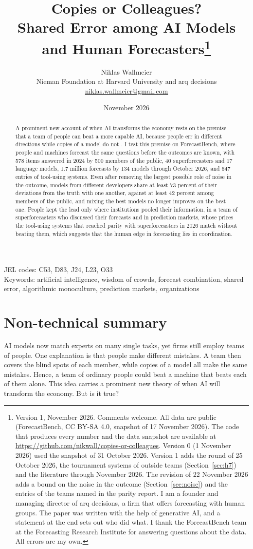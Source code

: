 \documentclass[11pt,a4paper]{article}
\title{\textbf{Copies or Colleagues?\\Shared Error among AI Models and Human Forecasters}\thanks{Version 1, November 2026. Comments welcome. All data are public (ForecastBench, CC BY-SA 4.0, snapshot of 17 November 2026). The code that produces every number and the data snapshot are available at \url{https://github.com/nikwall/copies-or-colleagues}. Version 0 (1 November 2026) used the snapshot of 31 October 2026. Version 1 adds the round of 25 October 2026, the tournament systems of outside teams (Section~\ref{sec:h7}) and the literature through November 2026. The revision of 22 November 2026 adds a bound on the noise in the outcome (Section~\ref{sec:noise}) and the entries of the teams named in the parity report. I am a founder and managing director of arq decisions, a firm that offers forecasting with human groups. The paper was written with the help of generative AI, and a statement at the end sets out who did what. I thank the ForecastBench team at the Forecasting Research Institute for answering questions about the data. All errors are my own.}}
\author{Niklas Wallmeier\\[2pt]
\small Nieman Foundation at Harvard University and arq decisions\\
\small \href{mailto:niklas.wallmeier@gmail.com}{niklas.wallmeier@gmail.com}}
\date{November 2026}
\theoremstyle{definition}
\begin{document}
\maketitle

\begin{abstract}
\noindent A prominent new account of when AI transforms the economy rests on the premise that a team of people can beat a more capable AI, because people err in different directions while copies of a model do not \citep{imas2026organizing}. I test this premise on ForecastBench, where people and machines forecast the same questions before the outcomes are known, with 578 items answered in 2024 by 500 members of the public, 40 superforecasters and 17 language models, 1.7 million forecasts by 134 models through October 2026, and 647 entries of tool-using systems. Even after removing the largest possible role of noise in the outcome, models from different developers share at least 73 percent of their deviations from the truth with one another, against at least 42 percent among members of the public, and mixing the best models no longer improves on the best one. People kept the lead only where institutions pooled their information, in a team of superforecasters who discussed their forecasts and in prediction markets, whose prices the tool-using systems that reached parity with superforecasters in 2026 match without beating them, which suggests that the human edge in forecasting lies in coordination.
\end{abstract}

\medskip
\noindent JEL codes: C53, D83, J24, L23, O33\\
\noindent Keywords: artificial intelligence, wisdom of crowds, forecast combination, shared error, algorithmic monoculture, prediction markets, organizations

\thispagestyle{empty}
\newpage

\section*{Non-technical summary}
\thispagestyle{empty}

AI models now match experts on many single tasks, yet firms still employ teams of people. One explanation is that people make different mistakes. A team then covers the blind spots of each member, while copies of a model all make the same mistakes. Hence, a team of ordinary people could beat a machine that beats each of them alone. This idea carries a prominent new theory of when AI will transform the economy. But is it true?
\end{document}
